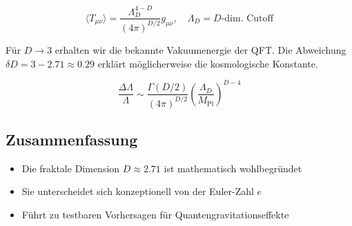 \begin{equation}
\langle T_{\mu\nu}\rangle = \frac{\Lambda_D^{4-D}}{(4\pi)^{D/2}} g_{\mu\nu}, \quad \Lambda_D = D\text{-dim. Cutoff}
\end{equation}

\begin{remark}
Für $D\to 3$ erhalten wir die bekannte Vakuumenergie der QFT. Die Abweichung $\delta D = 3 - 2.71 \approx 0.29$ erklärt möglicherweise die kosmologische Konstante.
\end{remark}

\begin{equation}
\frac{\Delta\Lambda}{\Lambda} \sim \frac{\Gamma(D/2)}{(4\pi)^{D/2}} \left(\frac{\Lambda_D}{M_{\mathrm{Pl}}}\right)^{D-4}
\end{equation}

\subsection*{Zusammenfassung}
\begin{itemize}
\item Die fraktale Dimension $D \approx 2.71$ ist mathematisch wohlbegründet
\item Sie unterscheidet sich konzeptionell von der Euler-Zahl $e$
\item Führt zu testbaren Vorhersagen für Quantengravitationseffekte
\end{itemize}

